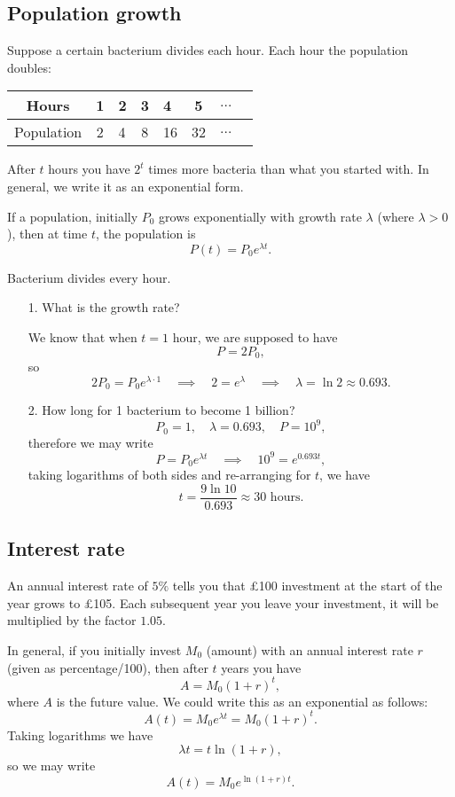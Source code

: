 \subsection{Population growth}
\begin{example}
Suppose a certain bacterium divides each hour. Each hour the population doubles:
\begin{center}
    \begin{tabular}{ | c | c | l c l | c | c | c |}
    \hline
    Hours & 1 & 2 & 3 & 4 & 5 & $\dots$  \\ \hline
    Population & 2 & 4 & 8 & 16 & 32 & $\dots$  \\ \hline
    \end{tabular}
\end{center}
\end{example}
After $t$ hours you have $2^t$ times more bacteria than what you started with. In general, we write it as an exponential form.

If a population, initially $P_0$ grows exponentially with growth rate $\lambda$ (where $\lambda>0$), then at time $t$, the population is
\[P(t)=P_0e^{\lambda t}.\]

\begin{example}
Bacterium divides every hour. 
\begin{itemize}
\item[1.] What is the growth rate?

We know that when $t=1$ hour, we are supposed to have 
\[P=2P_0,\]
so
\[2P_0=P_0e^{\lambda\cdot 1}\quad \implies \quad 2=e^{\lambda}\quad \implies \quad \lambda=\ln 2\approx 0.693.\]

\item[2.] How long for 1 bacterium to become 1 billion?
\[P_0=1,\quad \lambda=0.693,\quad P=10^9,\]
therefore we may write
\[P=P_0e^{\lambda t} \quad \implies \quad 10^9=e^{0.693 t},\]
taking logarithms of both sides and re-arranging for $t$, we have
\[t=\frac{9\ln 10}{0.693}\approx 30 \text{ hours.}\]
\end{itemize}
\end{example}

\subsection{Interest rate}

An annual interest rate of $5\%$ tells you that \pounds100 investment at the start of the year grows to \pounds105. Each subsequent year you leave your investment, it will be multiplied by the factor $1.05$.

In general, if you initially invest $M_0$ (amount) with an annual interest rate $r$ (given as percentage/100), then after $t$ years you have
\[A=M_0(1+r)^t,\]
where $A$ is the future value. We could write this as an exponential as follows:
\[A(t)=M_0e^{\lambda t}=M_0(1+r)^t.\]
Taking logarithms we have
\[\lambda t = t\ln(1+r),\]
so we may write
\[A(t)=M_0e^{\ln(1+r)t}.\]
